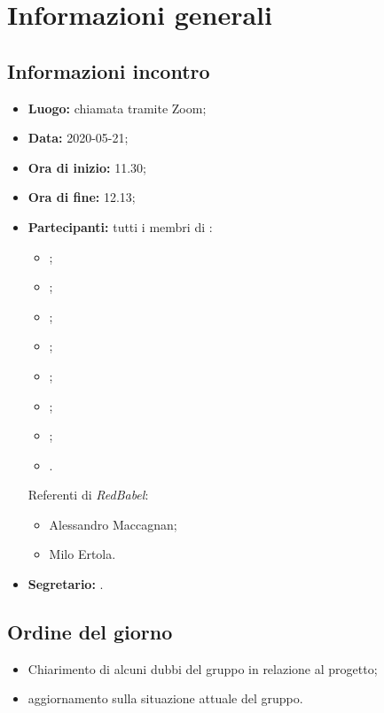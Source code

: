 \section{Informazioni generali}
\subsection{Informazioni incontro}
\begin{itemize}
	\item \textbf{Luogo:} chiamata tramite Zoom;
	\item \textbf{Data:} 2020-05-21;
	\item \textbf{Ora di inizio:} 11.30;
	\item \textbf{Ora di fine:} 12.13;
	\item \textbf{Partecipanti:}
		tutti i membri di \Gruppo:
		\begin{itemize}
			\item \VB;
			\item \LB;
			\item \NF;
			\item \EG;
			\item \FJ;
			\item \MP;
			\item \AS;
			\item \AZ.
		\end{itemize}
		Referenti di \textit{RedBabel}:
		\begin{itemize}
			\item Alessandro Maccagnan;
			\item Milo Ertola.
		\end{itemize}
	\item \textbf{Segretario:} \AS.
\end{itemize}

\subsection{Ordine del giorno}
\begin{itemize}
	\item Chiarimento di alcuni dubbi del gruppo in relazione al progetto;
	\item aggiornamento sulla situazione attuale del gruppo.
\end{itemize}
